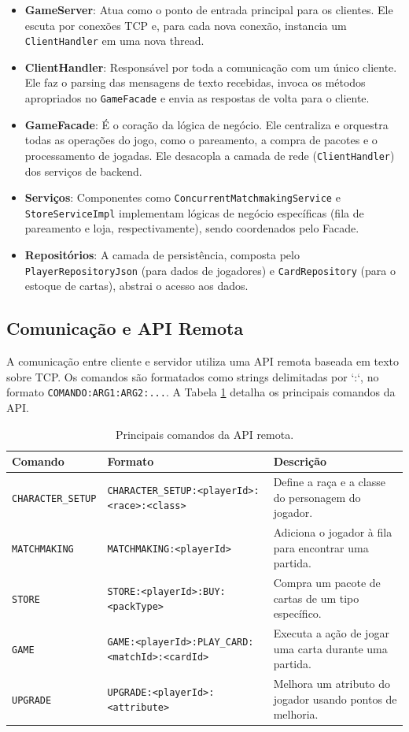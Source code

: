 \documentclass[12pt,a4paper]{article}
\begin{document}
\begin{itemize}
    \item \textbf{GameServer}: Atua como o ponto de entrada principal para os clientes. Ele escuta por conexões TCP e, para cada nova conexão, instancia um \texttt{ClientHandler} em uma nova thread.
    \item \textbf{ClientHandler}: Responsável por toda a comunicação com um único cliente. Ele faz o parsing das mensagens de texto recebidas, invoca os métodos apropriados no \texttt{GameFacade} e envia as respostas de volta para o cliente.
    \item \textbf{GameFacade}: É o coração da lógica de negócio. Ele centraliza e orquestra todas as operações do jogo, como o pareamento, a compra de pacotes e o processamento de jogadas. Ele desacopla a camada de rede (\texttt{ClientHandler}) dos serviços de backend.
    \item \textbf{Serviços}: Componentes como \texttt{ConcurrentMatchmakingService} e \texttt{StoreServiceImpl} implementam lógicas de negócio específicas (fila de pareamento e loja, respectivamente), sendo coordenados pelo Facade.
    \item \textbf{Repositórios}: A camada de persistência, composta pelo \texttt{PlayerRepositoryJson} (para dados de jogadores) e \texttt{CardRepository} (para o estoque de cartas), abstrai o acesso aos dados.
\end{itemize}

\subsection{Comunicação e API Remota}
A comunicação entre cliente e servidor utiliza uma API remota baseada em texto sobre TCP. Os comandos são formatados como strings delimitadas por `:`, no formato \texttt{COMANDO:ARG1:ARG2:...}. A Tabela \ref{tab:comandos} detalha os principais comandos da API.

\begin{table}[h!]
\centering
\caption{Principais comandos da API remota.}
\label{tab:comandos}
\begin{tabular}{lll}
\toprule
Comando & Formato & Descrição \\ \midrule
\texttt{CHARACTER\_SETUP} & \texttt{CHARACTER\_SETUP:<playerId>:<race>:<class>} & Define a raça e a classe do personagem do jogador. \\
\texttt{MATCHMAKING} & \texttt{MATCHMAKING:<playerId>} & Adiciona o jogador à fila para encontrar uma partida. \\
\texttt{STORE} & \texttt{STORE:<playerId>:BUY:<packType>} & Compra um pacote de cartas de um tipo específico. \\
\texttt{GAME} & \texttt{GAME:<playerId>:PLAY\_CARD:<matchId>:<cardId>} & Executa a ação de jogar uma carta durante uma partida. \\
\texttt{UPGRADE} & \texttt{UPGRADE:<playerId>:<attribute>} & Melhora um atributo do jogador usando pontos de melhoria. \\
\bottomrule
\end{tabular}
\end{table}
\end{document}
